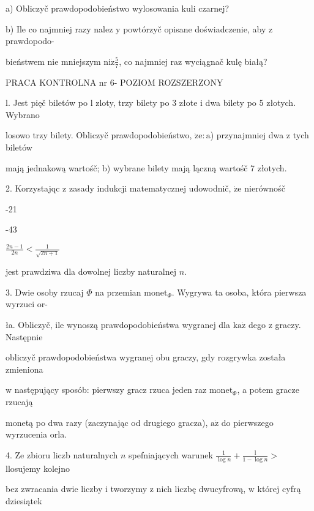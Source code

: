 \documentclass[a4paper,12pt]{article}
\begin{document}
a) Obliczyč prawdopodobieństwo wylosowania kuli czarnej?

b) Ile co najmniej razy nalez $\mathrm{y}$ powtórzyč opisane doświadczenie, aby $\mathrm{z}$ prawdopodo-

bieństwem nie mniejszym $\displaystyle \mathrm{n}\mathrm{i}\dot{\mathrm{z}}\frac{5}{7}$, co najmniej raz wyciągnač kulę białą?





PRACA KONTROLNA nr 6- POZIOM ROZSZERZONY

l. Jest pięč biletów po l zloty, trzy bilety po 3 złote $\mathrm{i}$ dwa bilety po 5 złotych. Wybrano

losowo trzy bilety. Obliczyč prawdopodobieństwo, $\dot{\mathrm{z}}\mathrm{e}:\mathrm{a}$) przynajmniej dwa $\mathrm{z}$ tych biletów

mają jednakową wartośč; b) wybrane bilety mają lączną wartośč 7 złotych.

2. Korzystajqc $\mathrm{z}$ zasady indukcji matematycznej udowodnič, $\dot{\mathrm{z}}\mathrm{e}$ nierównośč

-21

-43

$\displaystyle \frac{2n-1}{2n}<\frac{1}{\sqrt{2n+1}}$

jest prawdziwa dla dowolnej liczby naturalnej $n.$

3. Dwie osoby rzucaj $\Phi$ na przemian $\mathrm{m}\mathrm{o}\mathrm{n}\mathrm{e}\mathrm{t}_{\Phi}$. Wygrywa ta osoba, która pierwsza wyrzuci or-

ła. Obliczyč, ile wynoszą prawdopodobieństwa wygranej dla $\mathrm{k}\mathrm{a}\dot{\mathrm{z}}$ dego $\mathrm{z}$ graczy. Następnie

obliczyč prawdopodobieństwa wygranej obu graczy, gdy rozgrywka została zmieniona

$\mathrm{w}$ następujący sposób: pierwszy gracz rzuca jeden raz $\mathrm{m}\mathrm{o}\mathrm{n}\mathrm{e}\mathrm{t}_{\Phi}$, a potem gracze rzucają

monetą po dwa razy (zaczynając od drugiego gracza), $\mathrm{a}\dot{\mathrm{z}}$ do pierwszego wyrzucenia orla.

4. Ze zbioru liczb naturalnych $n$ spefniających warunek $\displaystyle \frac{1}{\log n}+\frac{\mathrm{l}}{1-\log n}>$ llosujemy kolejno

bez zwracania dwie liczby $\mathrm{i}$ tworzymy $\mathrm{z}$ nich liczbę dwucyfrową, $\mathrm{w}$ której cyfrą dziesiątek
\end{document}
